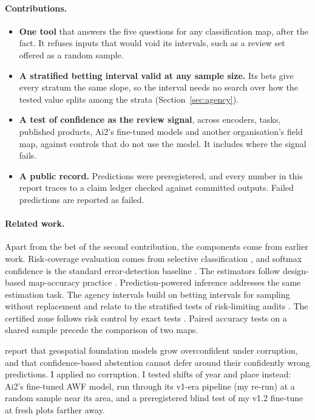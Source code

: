 \documentclass[11pt,a4paper]{article}
\begin{document}
\paragraph{Contributions.}
\begin{itemize}
\item \textbf{One tool} that answers the five questions for any classification map, after the fact. It refuses inputs
that would void its intervals, such as a review set offered as a random sample.
\item \textbf{A stratified betting interval valid at any sample size.} Its bets give every stratum the same slope, so
the interval needs no search over how the tested value splits among the strata (Section~\ref{sec:agency}).
\item \textbf{A test of confidence as the review signal}, across encoders, tasks, published products, Ai2's fine-tuned
models and another organisation's field map, against controls that do not use the model. It includes where the signal
fails.
\item \textbf{A public record.} Predictions were preregistered, and every number in this report traces to a claim
ledger checked against committed outputs. Failed predictions are reported as failed.
\end{itemize}

\paragraph{Related work.} Apart from the bet of the second contribution, the components come from earlier work.
Risk-coverage evaluation comes from selective classification \citep{geifman2017}, and softmax confidence is the
standard error-detection baseline \citep{hendrycks2017}. The estimators follow design-based map-accuracy practice
\citep{olofsson2014,stehman2019}. Prediction-powered inference \citep{angelopoulos2023ppi} addresses the same
estimation task. The agency intervals build on betting intervals for sampling without replacement
\citep{waudbysmith2024,stark2023alpha} and relate to the stratified tests of risk-limiting audits
\citep{spertus2022}. The certified zone follows risk control by exact tests \citep{bates2021}. Paired accuracy tests
on a shared sample \citep{foody2004} precede the comparison of two maps.

\citet{lehmann2026} report that geospatial foundation models grow overconfident under corruption, and that
confidence-based abstention cannot defer around their confidently wrong predictions. I applied no corruption. I tested
shifts of year and place instead: Ai2's fine-tuned AWF model, run through its v1-era pipeline (my re-run) at a random
sample near its area, and a preregistered blind test of my v1.2 fine-tune at fresh plots farther away.
\end{document}
